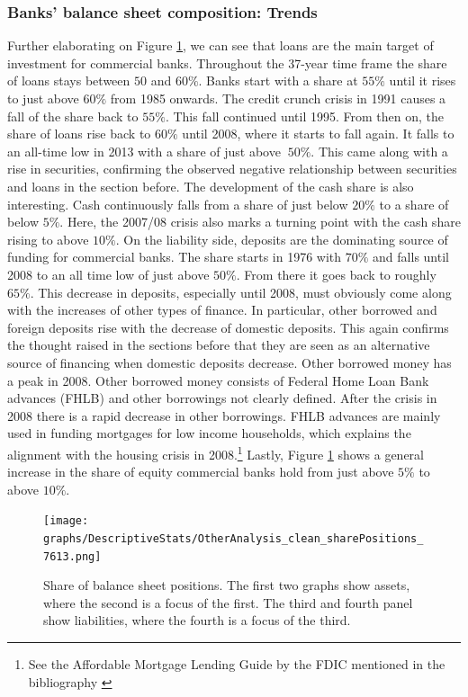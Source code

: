 \documentclass[12pt, a4paper]{article} %
\begin{document}
\subsubsection{Banks' balance sheet composition: Trends}
\label{sec:shareBalanceSheetAccounts}
Further elaborating on Figure \ref{fig:share_both}, we can see that loans are the main target of investment for commercial banks. Throughout the 37-year time frame the share of loans stays between $50$ and $60\%$. Banks start with a share at $55\%$ until it rises to just above $60\%$ from 1985 onwards. The credit crunch crisis in 1991 causes a fall of the share back to $55\%$. This fall continued until 1995. From then on, the share of loans rise back to $60\%$ until 2008, where it starts to fall again. It falls to an all-time low in 2013 with a share of just above $~50\%$. This came along with a rise in securities, confirming the observed negative relationship between securities and loans in the section before. 
The development of the cash share is also interesting. Cash continuously falls from a share of just below $20\%$ to a share of below $5\%$. Here, the 2007/08 crisis also marks a turning point with the cash share rising to above $10\%$.
On the liability side, deposits are the dominating source of funding for commercial banks. The share starts in 1976 with $70\%$ and falls until 2008 to an all time low of just above $50\%$. From there it goes back to roughly $65\%$. This decrease in deposits, especially until 2008, must obviously come along with the increases of other types of finance. In particular, other borrowed and foreign deposits rise with the decrease of domestic deposits. This again confirms the thought raised in the sections before that they are seen as an alternative source of financing when domestic deposits decrease.
Other borrowed money has a peak in 2008. Other borrowed money consists of Federal Home Loan Bank advances (FHLB) and other borrowings not clearly defined. After the crisis in 2008 there is a rapid decrease in other borrowings. FHLB advances are mainly used in funding mortgages for low income households, which explains the alignment with the housing crisis in 2008.\footnote{See the Affordable Mortgage Lending Guide by the FDIC mentioned in the bibliography \citet{FHLB}} Lastly, Figure \ref{fig:share_both} shows a general increase in the share of equity commercial banks hold from just above $5\%$ to above $10\%$. 

\begin{figure}[H]
\begin{minipage}{\textwidth}
\texttt{[image: graphs/DescriptiveStats/OtherAnalysis\_clean\_sharePositions\_7613.png]}
\caption[1]{Share of balance sheet positions. The first two graphs show assets, where the second is a focus of the first. The third and fourth panel show liabilities, where the fourth is a focus of the third.}
\label{fig:share_both}
\end{minipage}
\end{figure}
 
\end{document}

